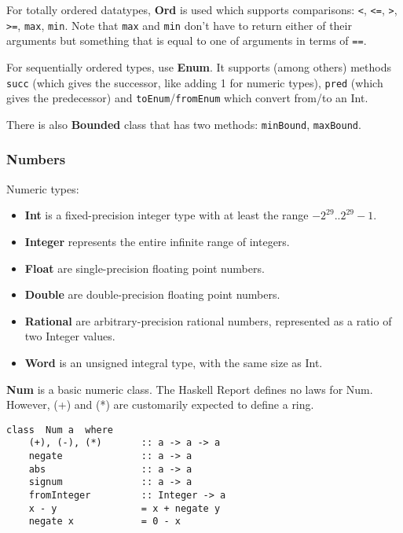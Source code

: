 For totally ordered datatypes, \textbf{Ord} is used which supports comparisons: \texttt{<}, \texttt{<=}, \texttt{>}, \texttt{>=}, \texttt{max}, \texttt{min}.
Note that \texttt{max} and \texttt{min} don't have to return either of their arguments but something that is equal to one of arguments in terms of \texttt{==}.

For sequentially ordered types, use \textbf{Enum}.
It supports (among others) methods \texttt{succ} (which gives the successor, like adding 1 for numeric types), \texttt{pred} (which gives the predecessor) and \texttt{toEnum}/\texttt{fromEnum} which convert from/to an Int.

There is also \textbf{Bounded} class that has two methods: \texttt{minBound}, \texttt{maxBound}.

\subsubsection{Numbers}
Numeric types:
\begin{itemize}
\item \textbf{Int} is a fixed-precision integer type with at least the range $-2^{29} .. 2^{29}-1$.
\item \textbf{Integer} represents the entire infinite range of integers.
\item \textbf{Float} are single-precision floating point numbers.
\item \textbf{Double} are double-precision floating point numbers.
\item \textbf{Rational} are arbitrary-precision rational numbers, represented as a ratio of two Integer values.
\item \textbf{Word} is an unsigned integral type, with the same size as Int.
\end{itemize}

\textbf{Num} is a basic numeric class.
The Haskell Report defines no laws for Num.
However, (+) and (*) are customarily expected to define a ring.
\begin{verbatim}
class  Num a  where
    (+), (-), (*)       :: a -> a -> a
    negate              :: a -> a
    abs                 :: a -> a
    signum              :: a -> a
    fromInteger         :: Integer -> a
    x - y               = x + negate y
    negate x            = 0 - x
\end{verbatim}


